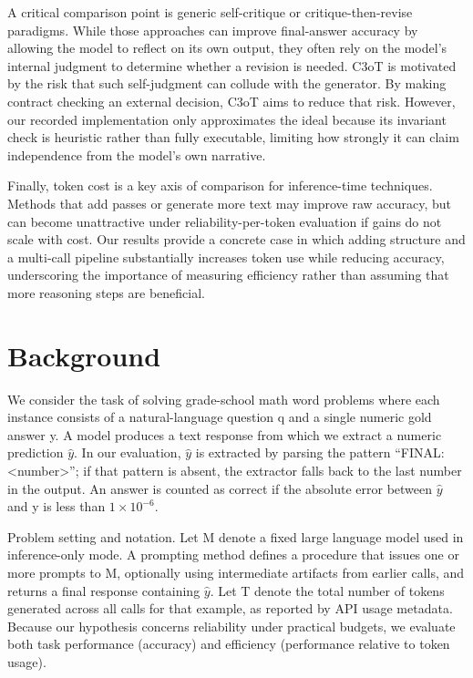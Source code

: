 \documentclass[journal,article,submit,pdftex,moreauthors]{Definitions/mdpi}
\begin{document}
A critical comparison point is generic self-critique or critique-then-revise paradigms. While those approaches can improve final-answer accuracy by allowing the model to reflect on its own output, they often rely on the model’s internal judgment to determine whether a revision is needed. C3oT is motivated by the risk that such self-judgment can collude with the generator. By making contract checking an external decision, C3oT aims to reduce that risk. However, our recorded implementation only approximates the ideal because its invariant check is heuristic rather than fully executable, limiting how strongly it can claim independence from the model’s own narrative.

Finally, token cost is a key axis of comparison for inference-time techniques. Methods that add passes or generate more text may improve raw accuracy, but can become unattractive under reliability-per-token evaluation if gains do not scale with cost. Our results provide a concrete case in which adding structure and a multi-call pipeline substantially increases token use while reducing accuracy, underscoring the importance of measuring efficiency rather than assuming that more reasoning steps are beneficial.

\section{Background}

We consider the task of solving grade-school math word problems where each instance consists of a natural-language question q and a single numeric gold answer y. A model produces a text response from which we extract a numeric prediction $\hat{y}$. In our evaluation, $\hat{y}$ is extracted by parsing the pattern “FINAL: <number>”; if that pattern is absent, the extractor falls back to the last number in the output. An answer is counted as correct if the absolute error between $\hat{y}$ and y is less than $1 \times 10^{-6}$.

Problem setting and notation. Let M denote a fixed large language model used in inference-only mode. A prompting method defines a procedure that issues one or more prompts to M, optionally using intermediate artifacts from earlier calls, and returns a final response containing $\hat{y}$. Let T denote the total number of tokens generated across all calls for that example, as reported by API usage metadata. Because our hypothesis concerns reliability under practical budgets, we evaluate both task performance (accuracy) and efficiency (performance relative to token usage).
\end{document}
